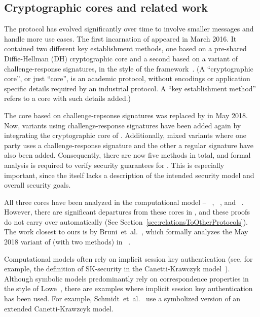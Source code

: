 \documentclass[runningheads, envcountsame, a4paper, draft, x11names]{llncs}
\begin{document}
 
\subsection{Cryptographic cores and related work}
\label{sec:relatedWork}
 
The \mEdhoc{} protocol has evolved significantly over time to involve smaller messages and handle more use cases. The first incarnation of \mEdhoc{} appeared in March 2016. It contained two different key establishment methods, one based on a
pre-shared Diffie-Hellman (DH) cryptographic core and a second based on a variant of challenge-response signatures, in the style of the \mNoise{} framework~\cite{perrin2016noise}. (A ``cryptographic core'', or just ``core'', is an academic protocol, without encodings or application specific details required by an industrial protocol. A ``key establishment method'' refers to a core with such details added.) 

The core based on challenge-repsonse signatures was replaced by \mSigma{} in May 2018. Now, variants using challenge-response signatures have been added again by integrating the cryptographic core of \mOptls{}. Additionally, mixed variants where one party uses a challenge-response signature and the other a regular signature have also been added. Consequently, there are now five methods in total, and formal analysis is required to verify security guarantees for \mEdhoc. This is especially important, since the \mSpec{} itself lacks a description of the intended security model and overall security goals. 

All three cores have been analyzed in the computational model -- \mSigma{}~\cite{DBLP:conf/crypto/CanettiK02}, \mOptls{}~\cite{DBLP:conf/eurosp/KrawczykW16}, and \mNoise{}~\cite{DBLP:conf/eurosp/KobeissiNB19}. However, there are significant departures from these cores in \mEdhoc, and these proofs do not carry over automatically (See Section~\ref{sec:relationsToOtherProtocols}). The work closest to ours is by Bruni~et~al.~\cite{DBLP:conf/secsr/BruniJPS18}, which formally analyzes the May 2018 variant of \mEdhoc{} (with two methods) in \mProverif~\cite{DBLP:conf/csfw/Blanchet01}.

Computational models often rely on implicit session key authentication (see, for example, the definition of SK-security in the Canetti-Krawczyk model~\cite{DBLP:conf/crypto/CanettiK02}). Although symbolic models predominantly rely on correspondence properties in the style of Lowe~\cite{DBLP:conf/csfw/Lowe97a}, there are examples where implicit session key authentication has been used. For example, Schmidt~et~al.~\cite{DBLP:conf/csfw/SchmidtMCB12} use a symbolized version of an extended Canetti-Krawzcyk model.
\end{document}
